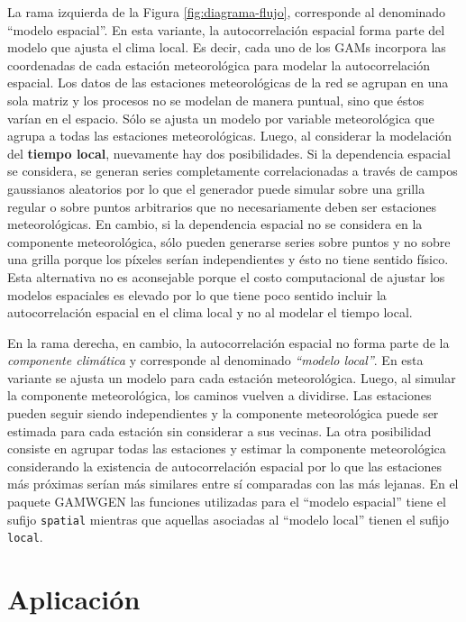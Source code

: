 \documentclass[
  12pt]{article}
\begin{document}
La rama izquierda de la Figura \ref{fig:diagrama-flujo}, corresponde al denominado ``modelo espacial''. En esta variante, la autocorrelación espacial forma parte del modelo que ajusta el clima local. Es decir, cada uno de los GAMs incorpora las coordenadas de cada estación meteorológica para modelar la autocorrelación espacial. Los datos de las estaciones meteorológicas de la red se agrupan en una sola matriz y los procesos no se modelan de manera puntual, sino que éstos varían en el espacio. Sólo se ajusta un modelo por variable meteorológica que agrupa a todas las estaciones meteorológicas. Luego, al considerar la modelación del \textbf{tiempo local}, nuevamente hay dos posibilidades. Si la dependencia espacial se considera, se generan series completamente correlacionadas a través de campos gaussianos aleatorios por lo que el generador puede simular sobre una grilla regular o sobre puntos arbitrarios que no necesariamente deben ser estaciones meteorológicas. En cambio, si la dependencia espacial no se considera en la componente meteorológica, sólo pueden generarse series sobre puntos y no sobre una grilla porque los píxeles serían independientes y ésto no tiene sentido físico. Esta alternativa no es aconsejable porque el costo computacional de ajustar los modelos espaciales es elevado por lo que tiene poco sentido incluir la autocorrelación espacial en el clima local y no al modelar el tiempo local.

En la rama derecha, en cambio, la autocorrelación espacial no forma parte de la \emph{componente climática} y corresponde al denominado \emph{``modelo local''}. En esta variante se ajusta un modelo para cada estación meteorológica. Luego, al simular la componente meteorológica, los caminos vuelven a dividirse. Las estaciones pueden seguir siendo independientes y la componente meteorológica puede ser estimada para cada estación sin considerar a sus vecinas. La otra posibilidad consiste en agrupar todas las estaciones y estimar la componente meteorológica considerando la existencia de autocorrelación espacial por lo que las estaciones más próximas serían más similares entre sí comparadas con las más lejanas.
En el paquete GAMWGEN las funciones utilizadas para el ``modelo espacial'' tiene el sufijo \texttt{spatial} mientras que aquellas asociadas al ``modelo local'' tienen el sufijo \texttt{local}.

\hypertarget{aplicaciuxf3n}{%
\section{Aplicación}\label{aplicaciuxf3n}}
\end{document}
